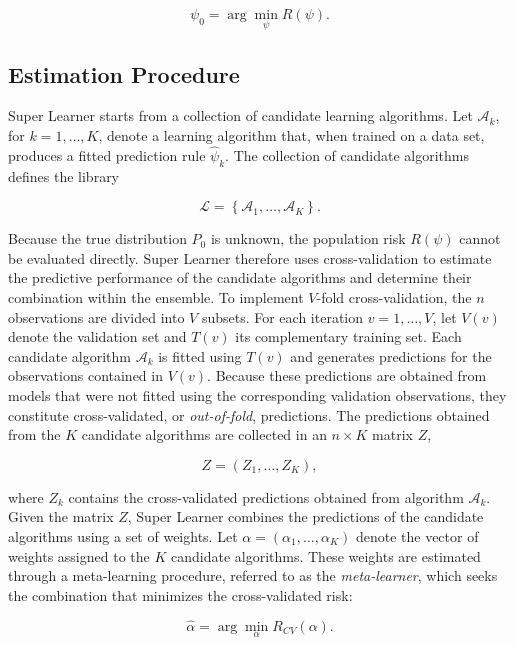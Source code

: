 \documentclass[12pt]{article}
\begin{document}
\begin{equation}
    \psi_0 = \arg\min_{\psi} R(\psi).
\end{equation}

\subsection{Estimation Procedure}
Super Learner starts from a collection of candidate learning algorithms. Let $\mathcal{A}_k$, for $k=1,\ldots,K$, denote a learning algorithm that, when trained on a data set, produces a fitted prediction rule $\widehat{\psi}_k$. The collection of candidate algorithms defines the library

\begin{equation}
    \mathcal{L} = \left\{\mathcal{A}_1,\ldots,\mathcal{A}_K\right\}.
\end{equation}

Because the true distribution $P_0$ is unknown, the population risk $R(\psi)$ cannot be evaluated directly. Super Learner therefore uses cross-validation to estimate the predictive performance of the candidate algorithms and determine their combination within the ensemble.
To implement $V$-fold cross-validation, the $n$ observations are divided into $V$ subsets. For each iteration $v=1,\ldots,V$, let $V(v)$ denote the validation set and $T(v)$ its complementary training set. Each candidate algorithm $\mathcal{A}_k$ is fitted using $T(v)$ and generates predictions for the observations contained in $V(v)$. Because these predictions are obtained from models that were not fitted using the corresponding validation observations, they constitute cross-validated, or \textit{out-of-fold}, predictions.
The predictions obtained from the $K$ candidate algorithms are collected in an $n \times K$ matrix $Z$,

\begin{equation}
    Z = (Z_1,\ldots,Z_K),
\end{equation}

where $Z_k$ contains the cross-validated predictions obtained from algorithm $\mathcal{A}_k$.
Given the matrix $Z$, Super Learner combines the predictions of the candidate algorithms using a set of weights. Let $\alpha=(\alpha_1,\ldots,\alpha_K)$ denote the vector of weights assigned to the $K$ candidate algorithms. These weights are estimated through a meta-learning procedure, referred to as the \textit{meta-learner}, which seeks the combination that minimizes the cross-validated risk:

\begin{equation}
    \widehat{\alpha}
    =
    \arg\min_{\alpha} R_{CV}(\alpha).
\end{equation}
\end{document}
